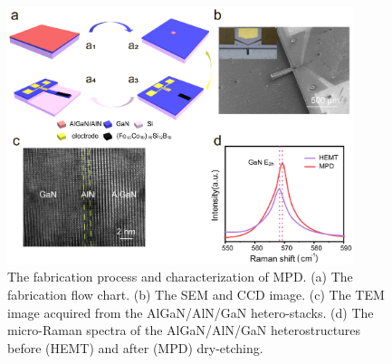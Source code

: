\begin{figure}[H] 
\centering    
\includegraphics[width=0.9\textwidth]{ch4_2}
\caption[The fabrication process and characterization of MPD]{The fabrication process and characterization of MPD. (a) The fabrication flow chart. (b) The SEM and CCD image. (c) The TEM image acquired from the AlGaN/AlN/GaN hetero-stacks. (d) The micro-Raman spectra of the AlGaN/AlN/GaN heterostructures before (HEMT) and after (MPD) dry-etching.}
\label{fig:4.2}
\end{figure}

